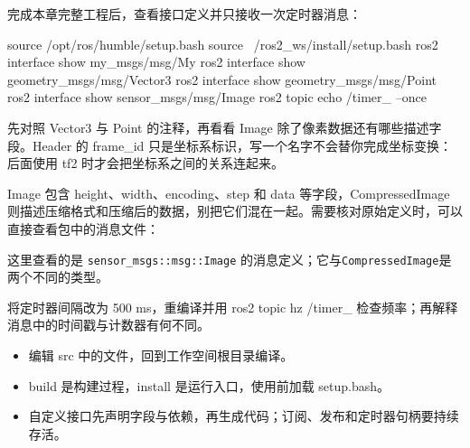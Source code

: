 \begin{example}
完成本章完整工程后，查看接口定义并只接收一次定时器消息：
\par\medskip\noindent\begin{minipage}{\linewidth}
\begin{tbash}
source /opt/ros/humble/setup.bash
source ~/ros2_ws/install/setup.bash
ros2 interface show my_msgs/msg/My
ros2 interface show geometry_msgs/msg/Vector3
ros2 interface show geometry_msgs/msg/Point
ros2 interface show sensor_msgs/msg/Image
ros2 topic echo /timer_ --once
\end{tbash}
\end{minipage}\par\smallskip
先对照 Vector3 与 Point 的注释，再看看 Image 除了像素数据还有哪些描述字段。Header 的 frame\_id 只是坐标系标识，写一个名字不会替你完成坐标变换：后面使用 tf2 时才会把坐标系之间的关系连起来。
\begin{note}
Image 包含 height、width、encoding、step 和 data 等字段，CompressedImage 则描述压缩格式和压缩后的数据，别把它们混在一起。需要核对原始定义时，可以直接查看包中的消息文件：
\par\medskip\noindent\begin{minipage}{\linewidth}
\end{minipage}\par\smallskip
这里查看的是 \texttt{sensor\_msgs::msg::Image} 的消息定义；它与\texttt{CompressedImage}是两个不同的类型。
\end{note}
\end{example}

\begin{exercise}
\label{ex:v2-ros-timer}
将定时器间隔改为 500 ms，重编译并用 ros2 topic hz /timer\_ 检查频率；再解释消息中的时间戳与计数器有何不同。
\end{exercise}

\begin{conclusion}
\begin{itemize}
\item 编辑 src 中的文件，回到工作空间根目录编译。
\item build 是构建过程，install 是运行入口，使用前加载 setup.bash。
\item 自定义接口先声明字段与依赖，再生成代码；订阅、发布和定时器句柄要持续存活。
\end{itemize}
\end{conclusion}

